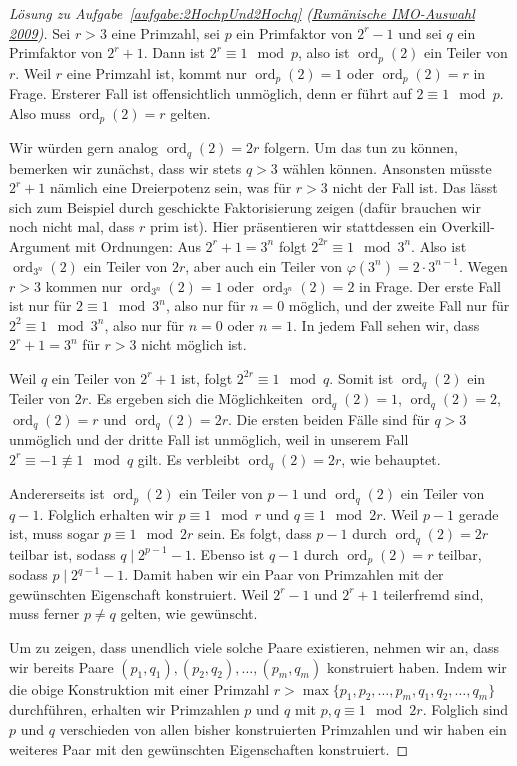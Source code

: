 \begin{proof}[Lösung zu Aufgabe~\ref{aufgabe:2HochpUnd2Hochq} \textmd{(\href{https://artofproblemsolving.com/community/c4464_2009_romania_team_selection_test}{Rumänische IMO-Auswahl 2009})}]
	Sei $r>3$ eine Primzahl, sei $p$ ein Primfaktor von $2^r-1$ und sei $q$ ein Primfaktor von $2^r+1$. Dann ist $2^r\equiv 1\mod p$, also ist $\operatorname{ord}_p(2)$ ein Teiler von $r$. Weil $r$ eine Primzahl ist, kommt nur $\operatorname{ord}_p(2)=1$ oder $\operatorname{ord}_p(2)=r$ in Frage. Ersterer Fall ist offensichtlich unmöglich, denn er führt auf $2\equiv 1\mod p$. Also muss $\operatorname{ord}_p(2)=r$ gelten.
	
	Wir würden gern analog $\operatorname{ord}_q(2)=2r$ folgern. Um das tun zu können, bemerken wir zunächst, dass wir stets $q>3$ wählen können. Ansonsten müsste $2^r+1$ nämlich eine Dreierpotenz sein, was für $r>3$ nicht der Fall ist. Das lässt sich zum Beispiel durch geschickte Faktorisierung zeigen (dafür brauchen wir noch nicht mal, dass $r$ prim ist). Hier präsentieren wir stattdessen ein Overkill-Argument mit Ordnungen: Aus $2^r+1=3^n$ folgt $2^{2r}\equiv 1\mod 3^n$. Also ist $\operatorname{ord}_{3^n}(2)$ ein Teiler von $2r$, aber auch ein Teiler von $\varphi(3^n)=2\cdot 3^{n-1}$. Wegen $r>3$ kommen nur $\operatorname{ord}_{3^n}(2)=1$ oder $\operatorname{ord}_{3^n}(2)=2$ in Frage. Der erste Fall ist nur für $2\equiv 1\mod 3^n$, also nur für $n=0$ möglich, und der zweite Fall nur für $2^2\equiv 1\mod 3^n$, also nur für $n=0$ oder $n=1$. In jedem Fall sehen wir, dass $2^r+1=3^n$ für $r>3$ nicht möglich ist.
	
	Weil $q$ ein Teiler von $2^r+1$ ist, folgt $2^{2r}\equiv 1\mod q$. Somit ist $\operatorname{ord}_q(2)$ ein Teiler von $2r$. Es ergeben sich die Möglichkeiten $\operatorname{ord}_q(2)=1$, $\operatorname{ord}_q(2)=2$, $\operatorname{ord}_q(2)=r$ und $\operatorname{ord}_q(2)=2r$. Die ersten beiden Fälle sind für $q>3$ unmöglich und der dritte Fall ist unmöglich, weil in unserem Fall $2^r\equiv -1\not\equiv 1\mod q$ gilt. Es verbleibt $\operatorname{ord}_q(2)=2r$, wie behauptet.
	
	Andererseits ist $\operatorname{ord}_p(2)$ ein Teiler von $p-1$ und $\operatorname{ord}_q(2)$ ein Teiler von $q-1$. Folglich erhalten wir $p\equiv 1\mod r$ und $q\equiv 1\mod 2r$. Weil $p-1$ gerade ist, muss sogar $p\equiv 1\mod 2r$ sein. Es folgt, dass $p-1$ durch $\operatorname{ord}_q(2)=2r$ teilbar ist, sodass $q\mid 2^{p-1}-1$. Ebenso ist $q-1$ durch $\operatorname{ord}_p(2)=r$ teilbar, sodass $p\mid 2^{q-1}-1$. Damit haben wir ein Paar von Primzahlen mit der gewünschten Eigenschaft konstruiert. Weil $2^r-1$ und $2^r+1$ teilerfremd sind, muss ferner $p\neq q$ gelten, wie gewünscht.
	
	Um zu zeigen, dass unendlich viele solche Paare existieren, nehmen wir an, dass wir bereits Paare $(p_1,q_1),(p_2,q_2),\dotsc,(p_m,q_m)$ konstruiert haben. Indem wir die obige Konstruktion mit einer Primzahl $r>\max\{p_1,p_2,\dotsc,p_m,q_1,q_2,\dotsc,q_m\}$ durchführen, erhalten wir Primzahlen $p$ und $q$ mit $p,q\equiv 1\mod 2r$. Folglich sind $p$ und $q$ verschieden von allen bisher konstruierten Primzahlen und wir haben ein weiteres Paar mit den gewünschten Eigenschaften konstruiert.
\end{proof}